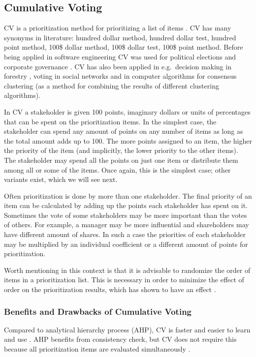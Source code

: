 

\subsection{Cumulative Voting\label{app:CV}}

CV is a prioritization method for prioritizing a list of items \cite{Leffingwell1999}.
CV has many synonyms in literature: hundred dollar method, hundred
dollar test, hundred point method, 100\$ dollar method, 100\$ dollar
test, 100\$ point method.
Before being applied in software engineering CV was used for
political elections \cite{Engstrom1999} and corporate governance
\cite{Bhagat1984}. CV has also been applied in e.g.\ decision making in forestry
\cite{Hiltunen2008}, voting in social networks \cite{Boldi:2009:VSN:1645953.1646052} and in computer algorithms for consensus clustering \cite{Ayad2008b} (as a method for combining the results of different clustering algorithms).

In CV a stakeholder is given 100 points,
imaginary dollars or units of percentages that can be spent on the prioritization
items. In the simplest case, the stakeholder can spend any amount of points on any number
of items as long as the total amount adds up to 100. The more points
assigned to an item, the higher the priority of the item (and implicitly, 
the lower priority to the other items). The
stakeholder may spend all the points on just one item or distribute
them among all or some of the items. Once again, this is the simplest case; other variants exist, which we will see next.

Often prioritization is done by more than one stakeholder. The final
priority of an item can be calculated by adding up the points each stakeholder
has spent on it. Sometimes the vote of some stakeholders may be more
important than the votes of others. For example, a manager may be
more influential and shareholders may have different
amount of shares. In such a case the priorities of each stakeholder
may be multiplied by an individual coefficient or a different amount of 
points for prioritization.

Worth mentioning in this context is that it is advisable to randomize 
the order of items in a prioritization list. This is necessary in order 
to minimize the effect of order on the prioritization
results, which has shown to have an effect \cite{Svahnberg2009}.

\subsubsection{Benefits and Drawbacks of Cumulative Voting}
Compared to analytical hierarchy process (AHP), CV is faster and easier to 
learn and use \cite{Berander2005,Ahl2005}.
AHP benefits from consistency check, but CV does not require this because
all prioritization items are evaluated simultaneously \cite{Ahl2005}.

